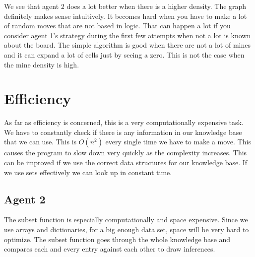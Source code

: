 \documentclass[11pt]{scrartcl} %
\begin{document}
We see that agent 2 does a lot better when there is a higher density. The graph definitely makes sense intuitively. It becomes hard when you have to make a lot of random moves that are not based in logic. That can happen a lot if you consider agent 1's strategy during the first few attempts when not a lot is known about the board. The simple algorithm is good when there are not a lot of mines and it can expand a lot of cells just by seeing a zero. This is not the case when the mine density is high. 

\section{Efficiency}
As far as efficiency is concerned, this is a very computationally expensive task. We have to constantly check if there is any information in our knowledge base that we can use. This is $O(n^2)$ every single time we have to make a move. This causes the program to slow down very quickly as the complexity increases. This can be improved if we use the correct data structures for our knowledge base. If we use sets effectively we can look up in constant time. 
\subsection{Agent 2}
The subset function is especially computationally and space expensive. Since we use arrays and dictionaries, for a big enough data set, space will be very hard to optimize. The subset function goes through the whole knowledge base and compares each and every entry against each other to draw inferences. 
\end{document}
